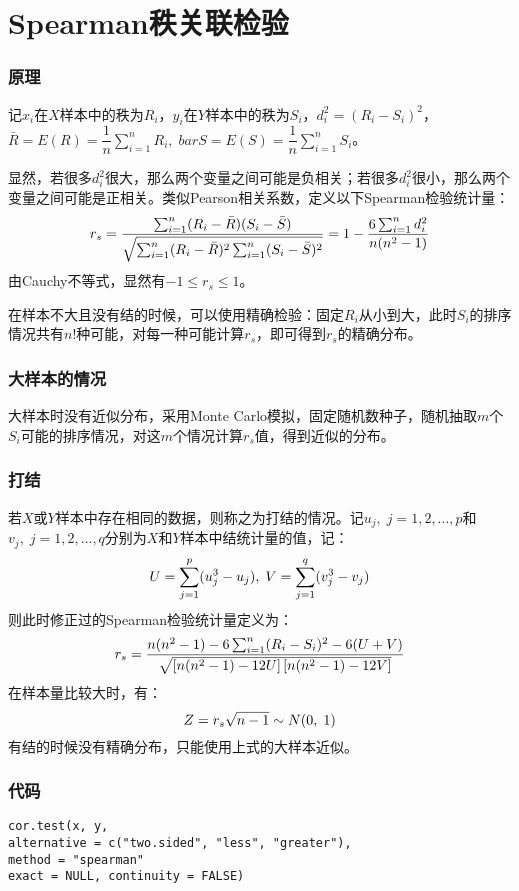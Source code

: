 \section{Spearman秩关联检验}

\subsubsection{原理}
记$x_i$在$X$样本中的秩为$R_i$，$y_i$在$Y$样本中的秩为$S_i$，$d_i^2=(R_i-S_i)^2$，$\bar{R}=E(R)=\dfrac{1}{n}\sum_{i=1}^nR_i,\;bar{S}=E(S)=\dfrac{1}{n}\sum_{i=1}^nS_i$。\par
显然，若很多$d_i^2$很大，那么两个变量之间可能是负相关；若很多$d_i^2$很小，那么两个变量之间可能是正相关。类似Pearson相关系数，定义以下Spearman检验统计量：
\begin{equation}
	r_s=\frac{\sum_{i=1}^n(R_i-\bar{R})(S_i-\bar{S})}{\sqrt{\sum_{i=1}^n(R_i-\bar{R})^2\sum_{i=1}^n(S_i-\bar{S})^2}}=1-\frac{6\sum_{i=1}^nd_i^2}{n(n^2-1)}\notag
\end{equation}
由Cauchy不等式，显然有$-1\leqslant r_s\leqslant1$。\par
在样本不大且没有结的时候，可以使用精确检验：固定$R_i$从小到大，此时$S_i$的排序情况共有$n!$种可能，对每一种可能计算$r_s$，即可得到$r_s$的精确分布。
\subsubsection{大样本的情况}
大样本时没有近似分布，采用Monte Carlo模拟，固定随机数种子，随机抽取$m$个$S_i$可能的排序情况，对这$m$个情况计算$r_s$值，得到近似的分布。
\subsubsection{打结}
若$X$或$Y$样本中存在相同的数据，则称之为打结的情况。记$u_j,\;j=1,2,\dots,p$和$v_j,\;j=1,2,\dots,q$分别为$X$和$Y$样本中结统计量的值，记：
\begin{equation}
	U=\sum_{j=1}^p(u_j^3-u_j),\;V=\sum_{j=1}^q(v_j^3-v_j)\notag
\end{equation}
则此时修正过的Spearman检验统计量定义为：
\begin{equation}
	r_s=\frac{n(n^2-1)-6\sum_{i=1}^n(R_i-S_i)^2-6(U+V)}{\sqrt{\left[n(n^2-1)-12U \right]\left[n(n^2-1)-12V \right]}}\notag
\end{equation}
在样本量比较大时，有：
\begin{equation}
	Z=r_s\sqrt{n-1}\sim N(0,\;1)\notag
\end{equation}
有结的时候没有精确分布，只能使用上式的大样本近似。

\subsubsection{代码}
\begin{verbatim}
cor.test(x, y,
alternative = c("two.sided", "less", "greater"),
method = "spearman"
exact = NULL, continuity = FALSE) 
\end{verbatim}
